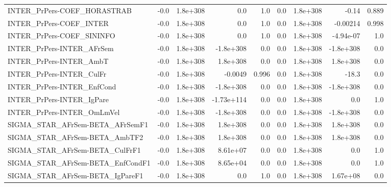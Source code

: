 \begin{tabular}{lrrrrrrrr}
INTER\_PrPers-COEF\_HORASTRAB           &        -0.0 &     1.8e+308 &        0.0 &      1.0 &        0.0 &    1.8e+308 &        -0.14 &         0.889 \\
INTER\_PrPers-COEF\_INTER               &        -0.0 &     1.8e+308 &        0.0 &      1.0 &        0.0 &    1.8e+308 &     -0.00214 &         0.998 \\
INTER\_PrPers-COEF\_SININFO             &        -0.0 &     1.8e+308 &        0.0 &      1.0 &        0.0 &    1.8e+308 &    -4.94e-07 &           1.0 \\
INTER\_PrPers-INTER\_AFrSem             &        -0.0 &     1.8e+308 &  -1.8e+308 &      0.0 &        0.0 &    1.8e+308 &    -1.8e+308 &           0.0 \\
INTER\_PrPers-INTER\_AmbT               &        -0.0 &     1.8e+308 &   1.8e+308 &      0.0 &        0.0 &    1.8e+308 &     1.8e+308 &           0.0 \\
INTER\_PrPers-INTER\_CulFr              &        -0.0 &     1.8e+308 &    -0.0049 &    0.996 &        0.0 &    1.8e+308 &        -18.3 &           0.0 \\
INTER\_PrPers-INTER\_EnfCond            &        -0.0 &     1.8e+308 &  -1.8e+308 &      0.0 &        0.0 &    1.8e+308 &    -1.8e+308 &           0.0 \\
INTER\_PrPers-INTER\_IgPare             &        -0.0 &     1.8e+308 & -1.73e+114 &      0.0 &        0.0 &    1.8e+308 &          0.0 &           1.0 \\
INTER\_PrPers-INTER\_OmLmVel            &        -0.0 &     1.8e+308 &  -1.8e+308 &      0.0 &        0.0 &    1.8e+308 &    -1.8e+308 &           0.0 \\
SIGMA\_STAR\_AFrSem-BETA\_AFrSemF1       &        -0.0 &     1.8e+308 &   1.8e+308 &      0.0 &        0.0 &    1.8e+308 &     1.8e+308 &           0.0 \\
SIGMA\_STAR\_AFrSem-BETA\_AmbTF2         &        -0.0 &     1.8e+308 &   1.8e+308 &      0.0 &        0.0 &    1.8e+308 &     1.8e+308 &           0.0 \\
SIGMA\_STAR\_AFrSem-BETA\_CulFrF1        &        -0.0 &     1.8e+308 &   8.61e+07 &      0.0 &        0.0 &    1.8e+308 &          0.0 &           1.0 \\
SIGMA\_STAR\_AFrSem-BETA\_EnfCondF1      &        -0.0 &     1.8e+308 &   8.65e+04 &      0.0 &        0.0 &    1.8e+308 &          0.0 &           1.0 \\
SIGMA\_STAR\_AFrSem-BETA\_IgPareF1       &        -0.0 &     1.8e+308 &        0.0 &      1.0 &        0.0 &    1.8e+308 &     1.67e+08 &           0.0 \\

\end{tabular}
